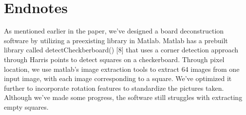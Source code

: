 \documentclass{article}
\begin{document}
\section{Endnotes}
\label{sec:copyright}
\hspace{\parindent}As mentioned earlier in the paper, we've designed a board deconstruction software by utilizing a preexisting library in Matlab. Matlab has a prebuilt library called detectCheckberboard() [8] that uses a corner detection approach through Harris points to detect squares on a checkerboard. Through pixel location, we use matlab's image extraction tools to extract 64 images from one input image, with each image corresponding to a square. We've optimized it further to incorporate rotation features to standardize the pictures taken. Although we've made some progress, the software still struggles with extracting empty squares. 




\end{document}
